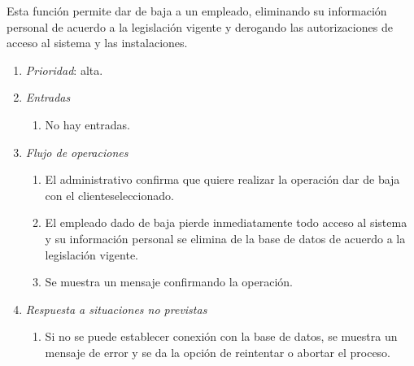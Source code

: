 

	Esta función permite dar de baja a un empleado, eliminando su información personal de acuerdo a la legislación vigente y derogando las autorizaciones de acceso al sistema y las instalaciones.
	
	\begin{enumerate}
		\item \textit{Prioridad}: alta.
		\item \textit{Entradas}
		\begin{enumerate}
			\item No hay entradas.
		\end{enumerate}
		\item \textit{Flujo de operaciones}
		\begin{enumerate}
			\item El administrativo confirma que quiere realizar la operación dar de baja con el cliente\break	 seleccionado.
			\item El empleado dado de baja pierde inmediatamente todo acceso al sistema y su información personal se elimina de la base de datos de acuerdo a la legislación vigente.
			\item Se muestra un mensaje confirmando la operación.
		\end{enumerate}
		\item \textit{Respuesta a situaciones no previstas}
		\begin{enumerate}
			\item Si no se puede establecer conexión con la base de datos, se muestra un mensaje de error y se da la opción de reintentar o abortar el proceso.
		\end{enumerate}
	\end{enumerate}
